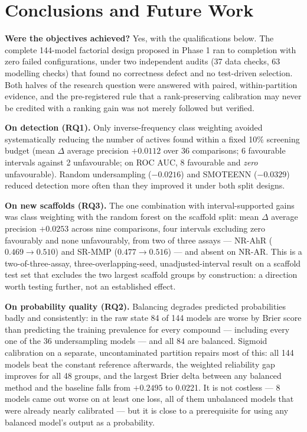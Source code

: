 \documentclass[10pt,letterpaper]{article}
\begin{document}
\section{Conclusions and Future Work}

\textbf{Were the objectives achieved?} Yes, with the qualifications below. The complete 144-model
factorial design proposed in Phase 1 ran to completion with zero failed configurations, under two
independent audits (37 data checks, 63 modelling checks) that found no correctness defect and no
test-driven selection. Both halves of the research question were answered with paired,
within-partition evidence, and the pre-registered rule that a rank-preserving calibration may never
be credited with a ranking gain was not merely followed but verified.

\textbf{On detection (RQ1).} Only inverse-frequency class weighting avoided systematically
reducing the number of actives found within a fixed 10\% screening budget (mean $\Delta$ average
precision $+0.0112$ over 36 comparisons; 6 favourable intervals against 2 unfavourable; on ROC AUC,
8 favourable and \emph{zero} unfavourable). Random undersampling ($-0.0216$) and SMOTEENN
($-0.0329$) reduced detection more often than they improved it under both split designs.

\textbf{On new scaffolds (RQ3).} The one combination with interval-supported gains was class
weighting with the random forest on the scaffold split: mean $\Delta$ average precision $+0.0253$
across nine comparisons, four intervals excluding zero favourably and none unfavourably, from two of
three assays --- NR-AhR ($0.469 \to 0.510$) and SR-MMP ($0.477 \to 0.516$) --- and absent on NR-AR.
This is a two-of-three-assay, three-overlapping-seed, unadjusted-interval result on a scaffold test
set that excludes the two largest scaffold groups by construction: a direction worth testing further,
not an established effect.

\textbf{On probability quality (RQ2).} Balancing degrades predicted probabilities badly and
consistently: in the raw state 84 of 144 models are worse by Brier score than predicting the training
prevalence for every compound --- including every one of the 36 undersampling models --- and all 84
are balanced. Sigmoid calibration on a separate, uncontaminated partition repairs most of this: all
144 models beat the constant reference afterwards, the weighted reliability gap improves for all 48
groups, and the largest Brier delta between any balanced method and the baseline falls from
$+0.2495$ to 0.0221. It is not costless --- 8 models came out worse on at least one loss, all of them
unbalanced models that were already nearly calibrated --- but it is close to a prerequisite for using
any balanced model's output as a probability.
\end{document}
